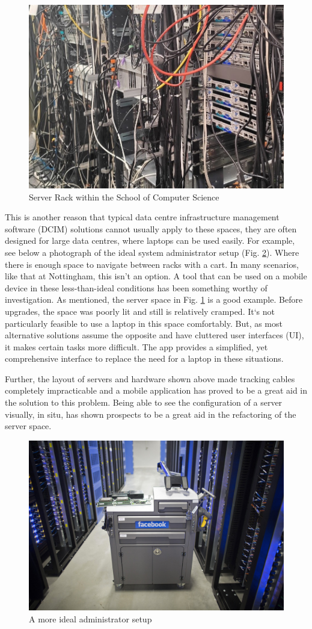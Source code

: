 \documentclass [11pt,a4paper]{article}
\begin{document}
\begin{figure}[H]
    \centering
    \includegraphics[width=0.40\linewidth]{images/server_racks.jpg}
    \caption{Server Rack within the School of Computer Science\cite{server_pic}}
    \label{fig:server_rack}
\end{figure}

This is another reason that typical data centre infrastructure management software (DCIM) solutions cannot usually apply to these spaces, they are often designed for large data centres, where laptops can be used easily. For example, see below a photograph of the ideal system administrator setup (Fig. \ref{fig:ideal_server_setup}). Where there is enough space to navigate between racks with a cart. In many scenarios, like that at Nottingham, this isn't an option. A tool that can be used on a mobile device in these less-than-ideal conditions has been something worthy of investigation. As mentioned, the server space in Fig. \ref{fig:server_rack} is a good example. Before upgrades, the space was poorly lit and still is relatively cramped. It`s not particularly feasible to use a laptop in this space comfortably. But, as most alternative solutions assume the opposite and have cluttered user interfaces (UI), it makes certain tasks more difficult. The app provides a simplified, yet comprehensive interface to replace the need for a laptop in these situations.

Further, the layout of servers and hardware shown above made tracking cables completely impracticable and a mobile application has proved to be a great aid in the solution to this problem. Being able to see the configuration of a server visually, in situ, has shown prospects to be a great aid in the refactoring of the server space.

\begin{figure}[H]
    \centering
    \includegraphics[width=0.40\linewidth]{images/facebook_cart.jpg}
    \caption{A more ideal administrator setup \cite{rosenblatt_2018}}
    \label{fig:ideal_server_setup}
\end{figure}
\end{document}
